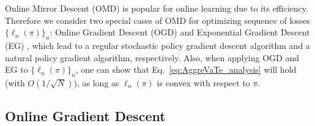\documentclass{article}
\newcommand{\todo}{\textcolor{red}{\textbf{[TODO]}}}
\begin{document}
Online Mirror Descent (OMD) \cite{shalev2012online} is popular for online learning due to its efficiency. Therefore we consider two special cases of  OMD for optimizing sequence of losses $\{\ell_n(\pi)\}_n$: Online Gradient Descent (OGD) \cite{Zinkevich2003_ICML}  and Exponential Gradient Descent (EG) \cite{shalev2012online}, which lead to a regular stochastic policy gradient descent algorithm and a natural policy gradient algorithm, respectively. Also, when applying OGD and EG to $\{\ell_n(\pi)\}_n$, one can show that Eq.~\ref{eq:AggreVaTe_analysis} will hold (with $O(1/\sqrt{N})$), as long as $\ell_n(\pi)$ is convex with respect to $\pi$. 



\subsection{Online Gradient Descent}
\end{document}
